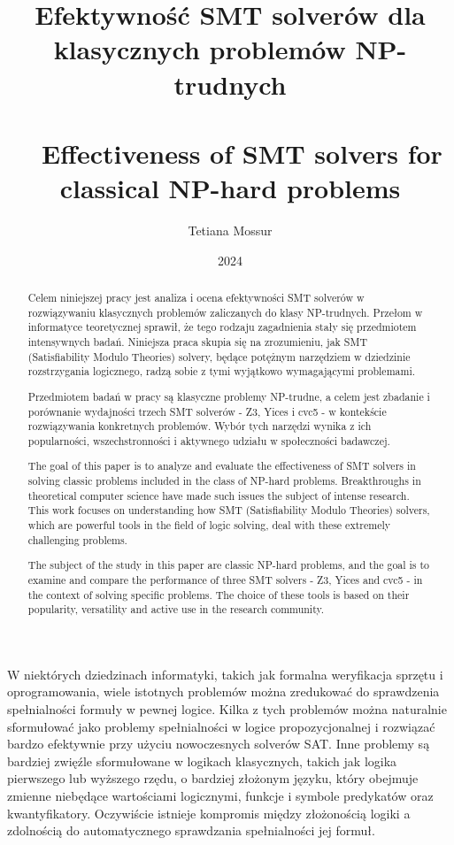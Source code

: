 \documentclass[xodstep]{wnspt}
\author   {Tetiana Mossur}
\date     {2024}
\title{Efektywność SMT solverów dla klasycznych problemów NP-trudnych
\\{~}
\\{~}
Effectiveness of SMT solvers for classical NP-hard problems}
\begin{document}
\begin{abstract}
Celem niniejszej pracy jest analiza i ocena efektywności SMT solverów w rozwiązywaniu klasycznych problemów zaliczanych do klasy NP-trudnych. Przełom w informatyce teoretycznej sprawił, że tego rodzaju zagadnienia stały się przedmiotem intensywnych badań. Niniejsza praca skupia się na zrozumieniu, jak SMT (Satisfiability Modulo Theories) solvery, będące potężnym narzędziem w dziedzinie rozstrzygania logicznego, radzą sobie z tymi wyjątkowo wymagającymi problemami.

Przedmiotem badań w pracy są klasyczne problemy NP-trudne, a celem jest zbadanie i porównanie wydajności trzech SMT solverów - Z3, Yices i cvc5 - w kontekście rozwiązywania konkretnych problemów. Wybór tych narzędzi wynika z ich popularności, wszechstronności i aktywnego udziału w społeczności badawczej.
\end{abstract}


\begin{abstract}
The goal of this paper is to analyze and evaluate the effectiveness of SMT solvers in solving classic problems included in the class of NP-hard problems. Breakthroughs in theoretical computer science have made such issues the subject of intense research. This work focuses on understanding how SMT (Satisfiability Modulo Theories) solvers, which are powerful tools in the field of logic solving, deal with these extremely challenging problems.

The subject of the study in this paper are classic NP-hard problems, and the goal is to examine and compare the performance of three SMT solvers - Z3, Yices and cvc5 - in the context of solving specific problems. The choice of these tools is based on their popularity, versatility and active use in the research community.
\end{abstract}



\maketitle
\onehalfspacing

\introduction
W niektórych dziedzinach informatyki, takich jak formalna weryfikacja sprzętu i oprogramowania, wiele istotnych problemów można zredukować do sprawdzenia spełnialności formuły w pewnej logice. Kilka z tych problemów można naturalnie sformułować jako problemy spełnialności w logice propozycjonalnej i rozwiązać bardzo efektywnie przy użyciu nowoczesnych solverów SAT. Inne problemy są bardziej zwięźle sformułowane w logikach klasycznych, takich jak logika pierwszego lub wyższego rzędu, o bardziej złożonym języku, który obejmuje zmienne niebędące wartościami logicznymi, funkcje i symbole predykatów oraz kwantyfikatory. Oczywiście istnieje kompromis między złożonością logiki a zdolnością do automatycznego sprawdzania spełnialności jej formuł.
\end{document}
